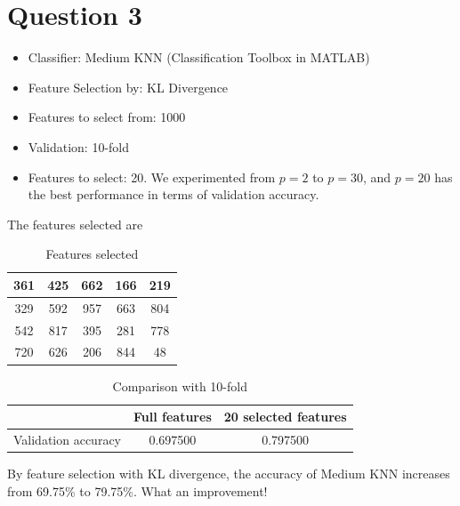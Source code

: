 \documentclass{article}
\begin{document}
\section*{Question 3}
{
    \begin{itemize}
        \item Classifier: Medium KNN (Classification Toolbox in MATLAB)
        \item Feature Selection by: KL Divergence
        \item Features to select from: 1000
        \item Validation: 10-fold
        \item Features to select: 20. We experimented from $p=2$ to $p=30$, and $p=20$ has the best performance in terms of validation accuracy.
    \end{itemize}

    The features selected are
    \begin{table}[!hbp]
        \centering
        \begin{tabular}{|c|c|c|c|c|}
        \hline
        361 & 425 & 662 & 166 & 219 \\
        \hline
        329 & 592 & 957 & 663 & 804 \\
        \hline
        542 & 817 & 395 & 281 & 778 \\
        \hline
        720 & 626 & 206 & 844 & 48 \\
        \hline
        \end{tabular}
        \caption{Features selected}
    \end{table}

    \begin{table}[!hbp]
        \centering
        \begin{tabular}{|c|c|c|}
        \hline
        & Full features & 20 selected features \\
        \hline
        Validation accuracy & 0.697500 & 0.797500 \\
        \hline
        \end{tabular}
        \caption{Comparison with 10-fold}
    \end{table}

    By feature selection with KL divergence, the accuracy of Medium KNN increases from 69.75\% to 79.75\%. What an improvement!
}
\end{document}
